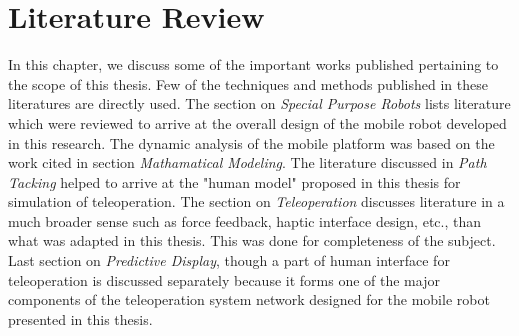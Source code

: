 \setcounter{secnumdepth}{4} 
\chapter{Literature Review}
\label{c2_LitRev}

In this chapter, we  discuss some of the important works published pertaining to the scope of this thesis. Few of the techniques and methods published in these literatures are directly used. The section on \textit{Special Purpose Robots} lists literature which were reviewed to arrive at the overall design of the mobile robot developed in this research.
 The dynamic analysis of the mobile platform was based on the work cited in section\textit{ Mathamatical Modeling}. 
 The literature discussed in \textit{Path Tacking } helped to arrive at the "human model" proposed in this thesis for simulation of teleoperation. 
 The section on \textit{Teleoperation} discusses literature in a much broader sense such as force feedback, haptic interface  design, etc., than what was adapted in this thesis. 
 This was done for completeness of the subject. 
 Last section on \textit{Predictive Display}, though a part of human interface for teleoperation is discussed separately because it forms one of the major components of the teleoperation system network designed  for the mobile robot  presented in this thesis.   
